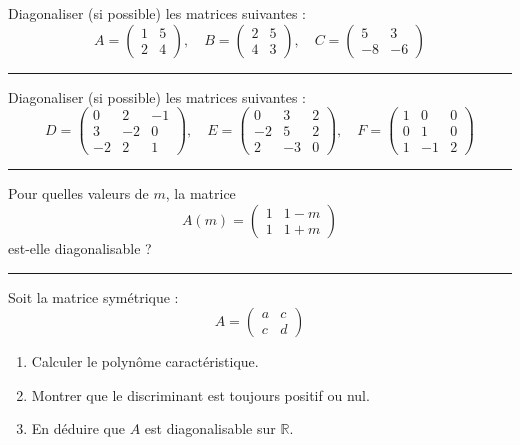 \documentclass[../PolyS4.tex]{subfiles}
\begin{document}
\newpage
{}

Diagonaliser (si possible) les matrices suivantes :
$$A = \begin{pmatrix}
1 & 5 \\
2 & 4
\end{pmatrix}, \quad
B = \begin{pmatrix}
2 & 5 \\
4 & 3
\end{pmatrix}, \quad
C = \begin{pmatrix}
5 & 3 \\
-8 & -6
\end{pmatrix}$$

\vspace{1em}
\hrule
\vspace{1em}


Diagonaliser (si possible) les matrices suivantes :
$$D = \begin{pmatrix}
0 & 2 & -1 \\
3 & -2 & 0 \\
-2 & 2 & 1
\end{pmatrix}, \quad
E = \begin{pmatrix}
0 & 3 & 2 \\
-2 & 5 & 2 \\
2 & -3 & 0
\end{pmatrix}, \quad
F = \begin{pmatrix}
1 & 0 & 0 \\
0 & 1 & 0 \\
1 & -1 & 2
\end{pmatrix}$$

\vspace{1em}
\hrule
\vspace{1em}


Pour quelles valeurs de $m$, la matrice 
$$A(m) = \begin{pmatrix}
1 & 1-m \\
1 & 1+m
\end{pmatrix}$$ 
est-elle diagonalisable ?

\vspace{1em}
\hrule
\vspace{1em}


Soit la matrice symétrique :
$$A = \begin{pmatrix}
a & c \\
c & d
\end{pmatrix}$$
\begin{enumerate}
    \item Calculer le polynôme caractéristique.
    \item Montrer que le discriminant est toujours positif ou nul.
    \item En déduire que $A$ est diagonalisable sur $\mathbb{R}$.
\end{enumerate}
\end{document}
